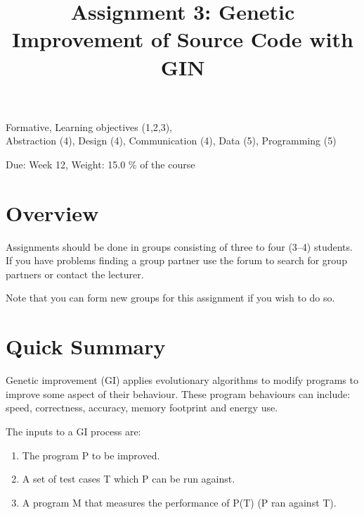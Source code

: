 \documentclass{pracs}
\newcommand{\duedate}{Week 12}
\begin{document}
\title{Assignment 3: Genetic Improvement of Source Code with GIN}
\maketitle
\thispagestyle{fancy}


	Formative,  	Learning objectives (1,2,3),\\
 	Abstraction (4), 	Design (4), 	Communication (4), 	Data (5),	Programming (5)


\noindent 

 \begin{center}
    Due: \duedate, Weight: 15.0 \% of the course
  \end{center}



\section{Overview}
Assignments should be done in groups consisting of three to four (3--4) students.  If you have problems finding a group partner use the forum to search for group partners or contact the lecturer. 

Note that you can form new groups for this assignment if you wish to do so.



\section*{Quick Summary}

Genetic improvement (GI) applies evolutionary algorithms to modify programs to improve some aspect of their behaviour. These program behaviours can include: speed, correctness, accuracy, memory footprint and energy use. 

The inputs to a GI process are:

\begin{enumerate}
\item The program P to be improved.
\item A set of test cases T which P can be run against.
\item A program M that measures the performance of P(T) (P ran against T).
\end{enumerate}
\end{document}
